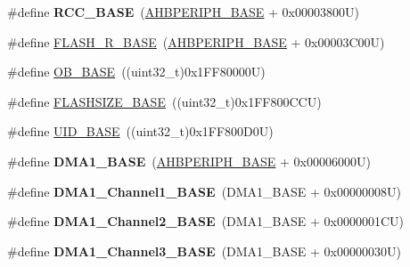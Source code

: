 \begin{DoxyCompactItemize}
\item 
\hypertarget{group___peripheral__memory__map_ga0e681b03f364532055d88f63fec0d99d}{\#define {\bfseries R\-C\-C\-\_\-\-B\-A\-S\-E}~(\hyperlink{group___peripheral__memory__map_ga92eb5d49730765d2abd0f5b09548f9f5}{A\-H\-B\-P\-E\-R\-I\-P\-H\-\_\-\-B\-A\-S\-E} + 0x00003800\-U)}\label{group___peripheral__memory__map_ga0e681b03f364532055d88f63fec0d99d}

\item 
\#define \hyperlink{group___peripheral__memory__map_ga8e21f4845015730c5731763169ec0e9b}{F\-L\-A\-S\-H\-\_\-\-R\-\_\-\-B\-A\-S\-E}~(\hyperlink{group___peripheral__memory__map_ga92eb5d49730765d2abd0f5b09548f9f5}{A\-H\-B\-P\-E\-R\-I\-P\-H\-\_\-\-B\-A\-S\-E} + 0x00003\-C00\-U)
\item 
\#define \hyperlink{group___peripheral__memory__map_gab5b5fb155f9ee15dfb6d757da1adc926}{O\-B\-\_\-\-B\-A\-S\-E}~((uint32\-\_\-t)0x1\-F\-F80000\-U)
\item 
\#define \hyperlink{group___peripheral__memory__map_ga776d985f2d4d40b588ef6ca9d573af78}{F\-L\-A\-S\-H\-S\-I\-Z\-E\-\_\-\-B\-A\-S\-E}~((uint32\-\_\-t)0x1\-F\-F800\-C\-C\-U)
\item 
\#define \hyperlink{group___peripheral__memory__map_ga664eda42b83c919b153b07b23348be67}{U\-I\-D\-\_\-\-B\-A\-S\-E}~((uint32\-\_\-t)0x1\-F\-F800\-D0\-U)
\item 
\hypertarget{group___peripheral__memory__map_gab2d8a917a0e4ea99a22ac6ebf279bc72}{\#define {\bfseries D\-M\-A1\-\_\-\-B\-A\-S\-E}~(\hyperlink{group___peripheral__memory__map_ga92eb5d49730765d2abd0f5b09548f9f5}{A\-H\-B\-P\-E\-R\-I\-P\-H\-\_\-\-B\-A\-S\-E} + 0x00006000\-U)}\label{group___peripheral__memory__map_gab2d8a917a0e4ea99a22ac6ebf279bc72}

\item 
\hypertarget{group___peripheral__memory__map_ga888dbc1608243badeb3554ffedc7364c}{\#define {\bfseries D\-M\-A1\-\_\-\-Channel1\-\_\-\-B\-A\-S\-E}~(D\-M\-A1\-\_\-\-B\-A\-S\-E + 0x00000008\-U)}\label{group___peripheral__memory__map_ga888dbc1608243badeb3554ffedc7364c}

\item 
\hypertarget{group___peripheral__memory__map_ga38a70090eef3687e83fa6ac0c6d22267}{\#define {\bfseries D\-M\-A1\-\_\-\-Channel2\-\_\-\-B\-A\-S\-E}~(D\-M\-A1\-\_\-\-B\-A\-S\-E + 0x0000001\-C\-U)}\label{group___peripheral__memory__map_ga38a70090eef3687e83fa6ac0c6d22267}

\item 
\hypertarget{group___peripheral__memory__map_ga70b3d9f36ca9ce95b4e421c11154fe5d}{\#define {\bfseries D\-M\-A1\-\_\-\-Channel3\-\_\-\-B\-A\-S\-E}~(D\-M\-A1\-\_\-\-B\-A\-S\-E + 0x00000030\-U)}\label{group___peripheral__memory__map_ga70b3d9f36ca9ce95b4e421c11154fe5d}


\end{DoxyCompactItemize}
